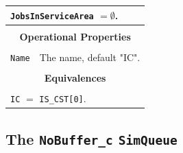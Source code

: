 \documentclass[12pt]{book}
\begin{document}
\begin{tabular}{|l|l|l|l|}
\multicolumn{4}{|l|}{\lstinline|JobsInServiceArea| $= \emptyset$.} \\
\hline
\multicolumn{4}{|c|}{} \\
\multicolumn{4}{|c|}{\bf Operational Properties} \\
\multicolumn{4}{|c|}{} \\
\hline
\lstinline|Name| & \multicolumn{3}{|l|}{The name, default "IC".} \\
\hline
\multicolumn{4}{|c|}{} \\
\multicolumn{4}{|c|}{\bf Equivalences} \\
\multicolumn{4}{|c|}{} \\
\hline
\multicolumn{4}{|l|}{\lstinline|IC| $=$ \lstinline|IS_CST[0]|.} \\
\hline
\end{tabular}

\subsection{The \lstinline{NoBuffer_c} \lstinline{SimQueue}}
\label{sec:NoBuffer_c}
\end{document}
